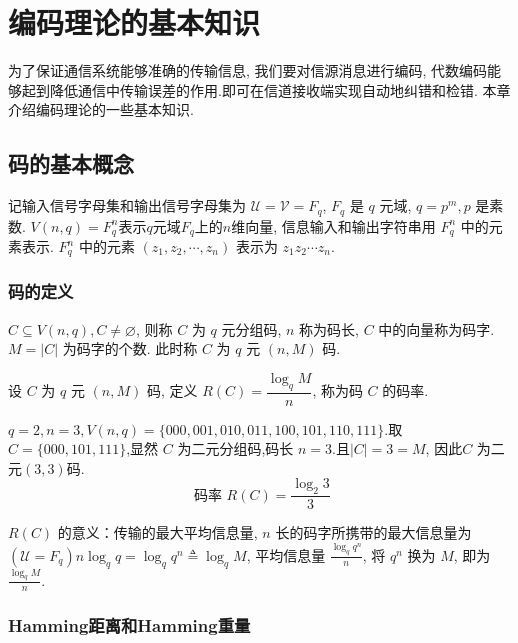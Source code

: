 \chapter{编码理论的基本知识}
为了保证通信系统能够准确的传输信息, 我们要对信源消息进行编码, 代数编码能够起到降低通信中传输误差的作用.即可在信道接收端实现自动地纠错和检错.
本章介绍编码理论的一些基本知识.

\section{码的基本概念}

记输入信号字母集和输出信号字母集为 $ \mathscr{U}=\mathscr{V}=F_{q} $, $ F_{q} $ 是 $ q $ 元域, $ q=p^{m}, p $ 是素数. $ V(n, q)=F_{q}^{n} $表示$q$元域$F_q$上的$n$维向量, 信息输入和输出字符串用 $ F_{q}^{n} $ 中的元素表示. $ F_{q}^{n} $ 中的元素 $ \left(z_{1}, z_{2}, \cdots, z_{n}\right) $ 表示为 $ z_{1} z_{2} \cdots z_{n} $.

\subsection{码的定义}
\begin{definition}
    $ C \subseteq V(n, q), C \neq \varnothing $, 则称 $ C $ 为 $ q $ 元分组码, $ n $ 称为码长, $ C $ 中的向量称为码字. $ M=|C| $ 为码字的个数. 此时称 $ C $ 为 $ q $ 元 $ (n, M) $ 码.
\end{definition}
\begin{definition}
    设 $ C $ 为 $ q $ 元 $ (n, M) $ 码, 定义 $ R(C)=\dfrac{\log _{q} M}{n} $, 称为码 $ C $ 的码率.
\end{definition}

\begin{example}
 $ q=2, n=3,V(n, q)=\{000,001,010,011,100,101,110,111\} . $取$C=\{000,101,111\}$,显然 $C$ 为二元分组码,码长 $n=3$.且$|C|=3=M$, 因此$C$ 为二元$(3,3)$码.
$$
\text { 码率 } R(C)=\frac{\log _{2} 3}{3}
$$
\end{example}
\begin{remark}
 $ R(C) $ 的意义：传输的最大平均信息量, $ n $ 长的码字所携带的最大信息量为 $ \left(\mathscr{U}=F_{q}\right) n \log _{q} q=\log _{q} q^{n} \triangleq \log _{q} M $, 平均信息量 $ \frac{\log _{q} q^{n}}{n} $, 将 $ q^{n} $ 换为 $ M $, 即为 $ \frac{\log _{q} M}{n} $.
\end{remark}

\subsection{Hamming距离和Hamming重量}

